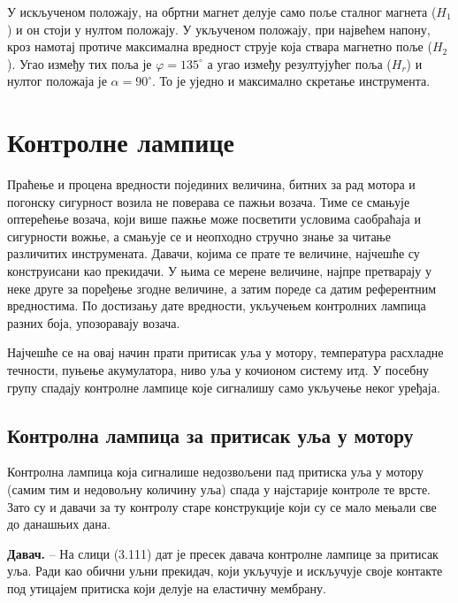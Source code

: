 \documentclass[12pt,a4paper]{report}
\begin{document}
У искљученом положају, на обртни магнет делује само поље сталног магнета ($H_1$) и он стоји у нултом положају. У укљученом положају, при највећем напону, кроз намотај протиче максимална вредност струје која ствара магнетно поље ($H_2$). Угао између тих поља је $\varphi = 135^\circ$ а угао између резултујућег поља ($H_r$) и нултог положаја је $\alpha = 90^\circ$. То је уједно и максимално скретање инструмента.

\section{Контролне лампице}

Праћење и процена вредности појединих величина, битних за рад мотора и погонску сигурност возила не поверава се пажњи возача. Тиме се смањује оптерећење возача, који више пажње може посветити условима саобраћаја и сигурности вожње, а смањује се и неопходно стручно знање за читање различитих инструмената.
Давачи, којима се прате те величине, најчешће су конструисани као прекидачи. У њима се мерене величине, најпре претварају у неке друге за поређење згодне величине, а затим пореде са датим референтним вредностима. По достизању дате вредности, укључењем контролних лампица разних боја, упозоравају возача.

Најчешће се на овај начин прати притисак уља у мотору, температура расхладне течности, пуњење акумулатора, ниво уља у кочионом систему итд. У посебну групу спадају контролне лампице које сигналишу само укључење неког уређаја.

\subsection{Контролна лампица за притисак уља у мотору}

Контролна лампица која сигналише недозвољени пад притиска уља у мотору (самим тим и недовољну количину уља) спада у најстарије контроле те врсте. Зато су и давачи за ту контролу старе конструкције који су се мало мењали све до данашњих дана.

\textbf{Давач.} – На слици (3.111) дат је пресек давача контролне лампице за притисак уља. Ради као обични уљни прекидач, који укључује и искључује своје контакте под утицајем притиска који делује на еластичну мембрану.

\end{document}

